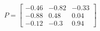 \documentclass[preview]{standalone}
\begin{document}
\begin{align*}
P=\left[\begin{matrix}-0.46&-0.82&-0.33\\-0.88&0.48&0.04\\-0.12&-0.3&0.94\end{matrix}\right]
\end{align*}
\end{document}
